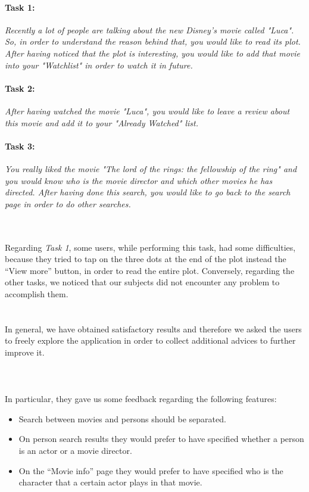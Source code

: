 \documentclass[12pt, a4paper]{article}
\numberwithin{figure}{section}
\begin{document}
\paragraph{Task 1:} \textit{Recently a lot of people are talking about the new Disney's movie called "Luca". So,
	in order to understand the reason behind that, you would like to read its plot. After having noticed that the plot is
	interesting, you would like to add that movie into your "Watchlist" in order to watch it in future.}

\paragraph{Task 2:} \textit{After having watched the movie "Luca", you would like to leave a review about this movie and
	add it to your "Already Watched" list.}

\paragraph{Task 3:} \textit{You really liked the movie "The lord of the rings: the fellowship of the ring" and you would know
	who is the movie director and which other movies he has directed. After having done this search, you would like to go back
	to the search page in order to do other searches.}

\mbox{}\\\\
Regarding \textit{Task 1}, some users, while performing this task, had some difficulties, because they tried to tap on
the three dots at the end of the plot instead the “View more” button, in order to read the entire plot.
Conversely, regarding the other tasks, we noticed that our subjects did not encounter any problem to accomplish them.\\\\\\
In general, we have obtained satisfactory results and therefore we asked the users to freely explore the application in order
to collect additional advices to further improve it.\\\\\\\\
In particular, they gave us some feedback regarding the following features:
\begin{itemize}
	\item {Search between movies and persons should be separated.}
	\item {On person search results they would prefer to have specified whether a person is an actor or
	      a movie director.}
	\item {On the “Movie info” page they would prefer to have specified who is the character that a certain
	      actor plays in that movie.}
\end{itemize}
\end{document}
